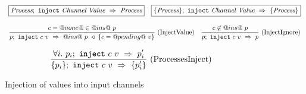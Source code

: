 
\begin{figure}

$$
\arrLR{
  \boxed{\ProcInject{\Proc}{\Chan}{\Value}{\Proc}}
}{
  \boxed{\ProcsInject{\sgl{\Proc}}{\Chan}{\Value}{\sgl{\Proc}}}
}
$$

$$
\ruleIN{
  c=@none@ \in @ins@~p
}{
  \ProcInject{p}{c}{v}{\HeapUpdateOne{c}{@pending@~v}{@ins@~p}}
}{InjectValue}
\ruleIN{
  c \not\in @ins@~p
}{
  \ProcInject{p}{c}{v}{p}
}{InjectIgnore}
$$

$$
\ruleIN{
  \forall i.~ \ProcInject{p_i}{c}{v}{p'_i}
}{
  \ProcsInject{\sgl{p_i}}{c}{v}{\sgl{p'_i}}
}{ProcessesInject}
$$

\caption{Injection of values into input channels}
\label{fig:Process:Eval:Inject}
\end{figure}


